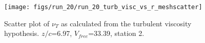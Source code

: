 \begin{figure}[H]
\centering
\texttt{[image: figs/run\_20/run\_20\_turb\_visc\_vs\_r\_meshscatter]}
\caption{Scatter plot of $\nu_T$ as calculated from the turbulent viscosity hypothesis. $z/c$=6.97, $V_{free}$=33.39, station 2.}
\label{fig:run_20_turb_visc_vs_r_meshscatter}
\end{figure}


